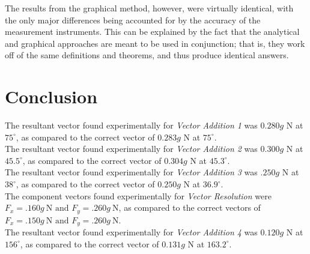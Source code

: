 \documentclass[11pt, titlepage]{article}
\begin{document}
The results from the graphical method, however, were virtually identical, with the only major differences being accounted for by the accuracy of the measurement instruments. This can be explained by the fact that the analytical and graphical approaches are meant to be used in conjunction; that is, they work off of the same definitions and theorems, and thus produce identical answers.

\section*{Conclusion}
The resultant vector found experimentally for \emph{Vector Addition 1} was $0.280g$ N at $75^\circ$, as compared to the correct vector of $0.283g$ N at $75^\circ$.\\
The resultant vector found experimentally for \emph{Vector Addition 2} was $0.300g$ N at $45.5^\circ$, as compared to the correct vector of $0.304g$ N at $45.3^\circ$.\\
The resultant vector found experimentally for \emph{Vector Addition 3} was $.250g$ N at $38^\circ$, as compared to the correct vector of $0.250g$ N at $36.9^\circ$.\\
The component vectors found experimentally for \emph{Vector Resolution} were $F_x = .160g ~\text{N and } F_y = .260g ~\text{N}$, as compared to the correct vectors of $F_x = .150g ~\text{N and } F_y = .260g ~\text{N}$.\\
The resultant vector found experimentally for \emph{Vector Addition 4} was $0.120g$ N at $156^\circ$, as compared to the correct vector of $0.131g$ N at $163.2^\circ$.
\end{document}
